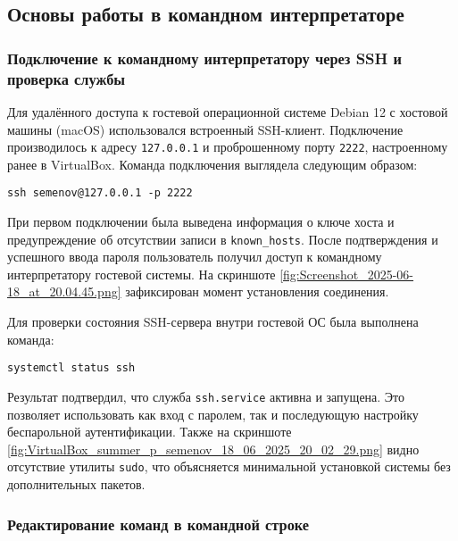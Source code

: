 \subsection{Основы работы в командном интерпретаторе}

\subsubsection{Подключение к командному интерпретатору через SSH и проверка службы}

Для удалённого доступа к гостевой операционной системе Debian 12 с хостовой машины (macOS) использовался встроенный SSH-клиент. Подключение производилось к адресу \texttt{127.0.0.1} и проброшенному порту \texttt{2222}, настроенному ранее в VirtualBox. Команда подключения выглядела следующим образом:

\begin{verbatim}
ssh semenov@127.0.0.1 -p 2222
\end{verbatim}

При первом подключении была выведена информация о ключе хоста и предупреждение об отсутствии записи в \texttt{known\_hosts}. После подтверждения и успешного ввода пароля пользователь получил доступ к командному интерпретатору гостевой системы. На скриншоте \ref{fig:Screenshot_2025-06-18_at_20.04.45.png} зафиксирован момент установления соединения.


Для проверки состояния SSH-сервера внутри гостевой ОС была выполнена команда:

\begin{verbatim}
systemctl status ssh
\end{verbatim}

Результат подтвердил, что служба \texttt{ssh.service} активна и запущена. Это позволяет использовать как вход с паролем, так и последующую настройку беспарольной аутентификации. Также на скриншоте \ref{fig:VirtualBox_summer_p_semenov_18_06_2025_20_02_29.png} видно отсутствие утилиты \texttt{sudo}, что объясняется минимальной установкой системы без дополнительных пакетов.


\subsubsection{Редактирование команд в командной строке}

